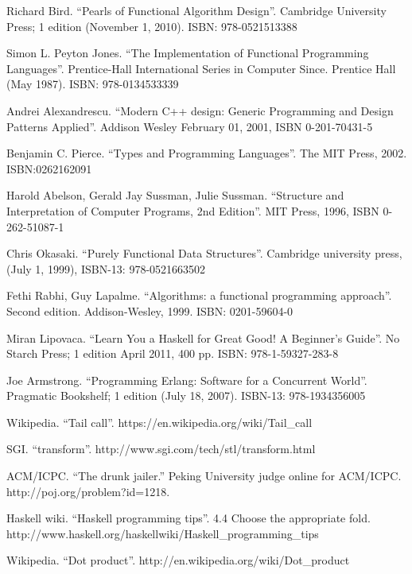 \documentclass{article}
\begin{document}
\begin{thebibliography}{99}

Richard Bird. ``Pearls of Functional Algorithm Design''. Cambridge University Press; 1 edition (November 1, 2010). ISBN: 978-0521513388

Simon L. Peyton Jones. ``The Implementation of Functional Programming Languages''. Prentice-Hall International Series in Computer Since. Prentice Hall (May 1987). ISBN: 978-0134533339

Andrei Alexandrescu. ``Modern C++ design: Generic Programming and Design Patterns Applied''. Addison Wesley February 01, 2001, ISBN 0-201-70431-5

Benjamin C. Pierce. ``Types and Programming Languages''. The MIT Press, 2002. ISBN:0262162091

Harold Abelson, Gerald Jay Sussman, Julie Sussman. ``Structure and Interpretation of Computer Programs, 2nd Edition''. MIT Press, 1996, ISBN 0-262-51087-1

Chris Okasaki. ``Purely Functional Data Structures''. Cambridge university press, (July 1, 1999), ISBN-13: 978-0521663502

Fethi Rabhi, Guy Lapalme. ``Algorithms: a functional programming approach''. Second edition. Addison-Wesley, 1999. ISBN: 0201-59604-0

Miran Lipovaca. ``Learn You a Haskell for Great Good! A Beginner's Guide''. No Starch Press; 1 edition April 2011, 400 pp. ISBN: 978-1-59327-283-8

Joe Armstrong. ``Programming Erlang: Software for a Concurrent World''. Pragmatic Bookshelf; 1 edition (July 18, 2007). ISBN-13: 978-1934356005

Wikipedia. ``Tail call''. https://en.wikipedia.org/wiki/Tail\_call

SGI. ``transform''. http://www.sgi.com/tech/stl/transform.html

ACM/ICPC. ``The drunk jailer.'' Peking University judge online for ACM/ICPC. http://poj.org/problem?id=1218.

Haskell wiki. ``Haskell programming tips''. 4.4 Choose the appropriate fold. http://www.haskell.org/haskellwiki/Haskell\_programming\_tips

Wikipedia. ``Dot product''. http://en.wikipedia.org/wiki/Dot\_product

\end{thebibliography}

\ifx\wholebook\relax \else
\end{document}
